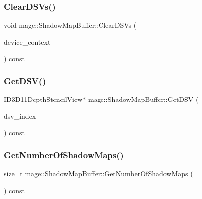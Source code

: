 \hypertarget{structmage_1_1_shadow_map_buffer_ac2e03bb5d33f5014d9ef66df401308d9}{}\label{structmage_1_1_shadow_map_buffer_ac2e03bb5d33f5014d9ef66df401308d9} 
\subsubsection{\texorpdfstring{Clear\+D\+S\+Vs()}{ClearDSVs()}}
{\footnotesize\ttfamily void mage\+::\+Shadow\+Map\+Buffer\+::\+Clear\+D\+S\+Vs (\begin{DoxyParamCaption}\item[{I\+D3\+D11\+Device\+Context4 $\ast$}]{device\+\_\+context }\end{DoxyParamCaption}) const\hspace{0.3cm}{\ttfamily [noexcept]}}

\hypertarget{structmage_1_1_shadow_map_buffer_a8762dcdaca36c7a206dac362d387f0f1}{}\label{structmage_1_1_shadow_map_buffer_a8762dcdaca36c7a206dac362d387f0f1} 
\subsubsection{\texorpdfstring{Get\+D\+S\+V()}{GetDSV()}}
{\footnotesize\ttfamily I\+D3\+D11\+Depth\+Stencil\+View$\ast$ mage\+::\+Shadow\+Map\+Buffer\+::\+Get\+D\+SV (\begin{DoxyParamCaption}\item[{size\+\_\+t}]{dsv\+\_\+index }\end{DoxyParamCaption}) const\hspace{0.3cm}{\ttfamily [noexcept]}}

\hypertarget{structmage_1_1_shadow_map_buffer_ab0b78c26663aa303d8f72dc89ec25eea}{}\label{structmage_1_1_shadow_map_buffer_ab0b78c26663aa303d8f72dc89ec25eea} 
\subsubsection{\texorpdfstring{Get\+Number\+Of\+Shadow\+Maps()}{GetNumberOfShadowMaps()}}
{\footnotesize\ttfamily size\+\_\+t mage\+::\+Shadow\+Map\+Buffer\+::\+Get\+Number\+Of\+Shadow\+Maps (\begin{DoxyParamCaption}{ }\end{DoxyParamCaption}) const\hspace{0.3cm}{\ttfamily [noexcept]}}

